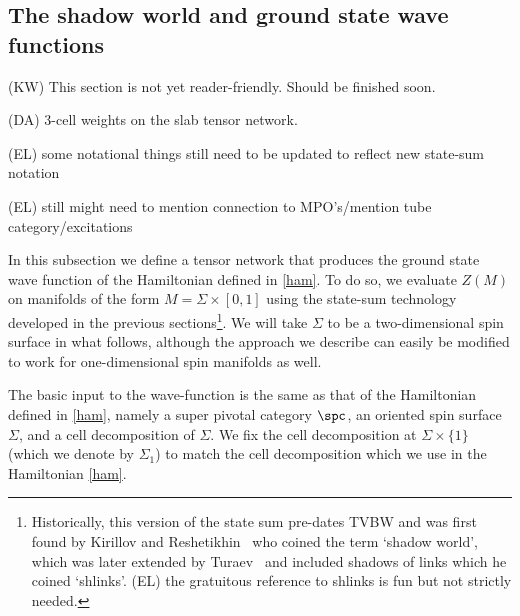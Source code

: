 \documentclass[12pt,a4paper]{article}
\newcommand{\kw}[1]{{\color{kwcolor}\footnotesize{(KW) #1}}}
\newcommand{\dave}[1]{{\color{ao(english)}\footnotesize{(DA) #1}}}
\newcommand{\ethan}[1]{{\color{amethyst}\footnotesize{(EL) #1}}}
\begin{document}


\subsection{The shadow world and ground state wave functions}

\kw{This section is not yet reader-friendly.  Should be finished soon.}

\dave{3-cell weights on the slab tensor network.}


\ethan{some notational things still need to be updated to reflect new state-sum notation}

\ethan{still might need to mention connection to MPO's/mention tube category/excitations}



In this subsection we define a tensor network that produces the ground state wave function of the Hamiltonian defined in \eqref{ham}.
To do so, we evaluate $Z(M)$ on manifolds of the form $M =\Sigma \times [0,1]$ using the 
state-sum technology developed in the previous sections\footnote{Historically, this version of the state sum 
pre-dates TVBW and was first found by Kirillov and Reshetikhin~\cite{Kirillow1989} who coined the term 
`shadow world', which was later extended by Turaev~\cite{turaev1992shadow} and included shadows of links 
which he coined `shlinks'. \ethan{the gratuitous reference to shlinks is fun but not strictly needed}.}. 
We will take $\Sigma$ to be a two-dimensional spin surface in what follows, although 
the approach we describe can easily be modified to work for one-dimensional spin manifolds as well. 

The basic input to the wave-function is the same as that of the Hamiltonian defined in \eqref{ham}, namely 
a super pivotal category $\spc$, an oriented spin surface $\Sigma$, and a cell decomposition of $\Sigma$.
We fix the cell decomposition at $\Sigma \times \{ 1 \} $ (which we denote by $\Sigma_1$) to match the cell decomposition which we use in the Hamiltonian \eqref{ham}.
\end{document}
